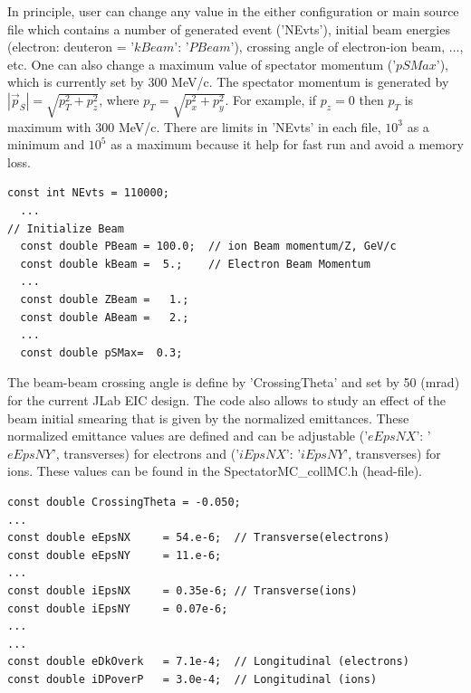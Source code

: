 \documentclass[12pt,letterpaper]{article}
\begin{document}
In principle, user can change any value in the either configuration or main source file which contains a number of generated event ('NEvts'), initial beam energies (electron: deuteron = '$kBeam$': '$PBeam$'), crossing angle of electron-ion beam, ..., etc. One can also change a maximum value of spectator momentum ('$pSMax$'), which is currently set by 300 MeV/c. The spectator momentum is generated by $|\vec{p}_S|=\sqrt{p_T^2+p_z^2}$, where $p_T = \sqrt{p_x^2+p_y^2}$. For example, if $p_z = 0$ then $p_T$ is maximum with 300 MeV/c. There are limits in 'NEvts' in each file, $10^3$ as a minimum and $10^5$ as a maximum  because it help for fast run and avoid a memory loss. 
\fontsize{9}{9}
\begin{Verbatim}[frame=single]
  const int NEvts = 110000;
  ...
// Initialize Beam
  const double PBeam = 100.0;  // ion Beam momentum/Z, GeV/c
  const double kBeam =  5.;    // Electron Beam Momentum
  ...
  const double ZBeam =   1.;
  const double ABeam =   2.;
  ...
  const double pSMax=  0.3;
\end{Verbatim}




 The beam-beam crossing angle is define by 'CrossingTheta' and set by 50 (mrad) for the current JLab EIC design. The code also allows to study an effect of the beam initial smearing that is given by the normalized emittances.  These normalized emittance values are defined and can be adjustable ('$eEpsNX$': '$eEpsNY$', transverses) for electrons and ('$iEpsNX$': '$iEpsNY$', transverses) for ions. These values can be found in the SpectatorMC\_collMC.h (head-file). 

\fontsize{9}{9}
\begin{Verbatim}[frame=single]
const double CrossingTheta = -0.050;
...
const double eEpsNX     = 54.e-6;  // Transverse(electrons)
const double eEpsNY     = 11.e-6;
...
const double iEpsNX     = 0.35e-6; // Transverse(ions)
const double iEpsNY     = 0.07e-6;
...
...
const double eDkOverk   = 7.1e-4;  // Longitudinal (electrons)
const double iDPoverP   = 3.0e-4;  // Longitudinal (ions)
\end{Verbatim}
\end{document}
